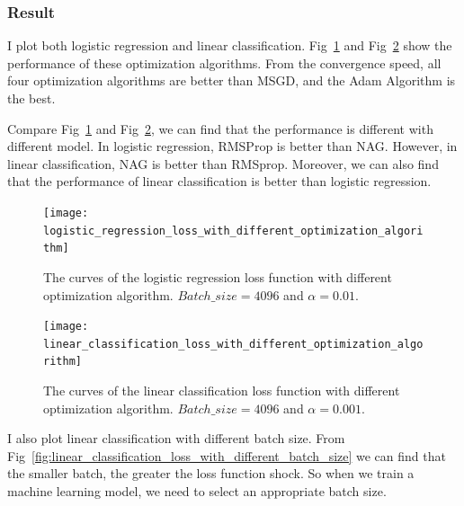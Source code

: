 \documentclass[journal, a4paper]{IEEEtran}
\begin{document}
\subsubsection{Result}

I plot both logistic regression and linear classification. 
Fig~\ref{fig:logistic_regression_loss_with_different_optimization_algorithm} and Fig~\ref{fig:linear_classification_loss_with_different_optimization_algorithm} show the performance of these optimization algorithms. 
From the convergence speed, all four optimization algorithms are better than MSGD, and the Adam Algorithm is the best. 

Compare Fig~\ref{fig:logistic_regression_loss_with_different_optimization_algorithm} and Fig~\ref{fig:linear_classification_loss_with_different_optimization_algorithm}, we can find that the performance is different with different model. 
In logistic regression, RMSProp is better than NAG. 
However, in linear classification, NAG is better than RMSprop.
Moreover, we can also find that the performance of linear classification is better than logistic regression.


\begin{figure}[!hbt]
    \begin{center}
    \texttt{[image: logistic\_regression\_loss\_with\_different\_optimization\_algorithm]}
    \caption{The curves of the logistic regression loss function with different optimization algorithm. $Batch\_size=4096$ and $\alpha=0.01$.}
    \label{fig:logistic_regression_loss_with_different_optimization_algorithm}
    \end{center}
\end{figure}

\begin{figure}[!hbt]
    \begin{center}
    \texttt{[image: linear\_classification\_loss\_with\_different\_optimization\_algorithm]}
    \caption{The curves of the linear classification loss function with different optimization algorithm. $Batch\_size=4096$ and $\alpha=0.001$.}
    \label{fig:linear_classification_loss_with_different_optimization_algorithm}
    \end{center}
\end{figure}

I also plot linear classification with different batch size.
From Fig~\ref{fig:linear_classification_loss_with_different_batch_size} we can find that the smaller batch, the greater the loss function shock. So when we train a machine learning model, we need to select an appropriate batch size.
\end{document}
